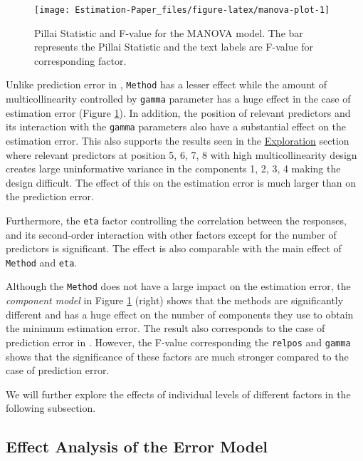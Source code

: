 \documentclass[12pt,3p,authoryear]{elsarticle}
\providecommand{\tightlist}{%
  \setlength{\itemsep}{0pt}\setlength{\parskip}{0pt}}
\begin{document}
\begin{figure}
\texttt{[image: Estimation-Paper\_files/figure-latex/manova-plot-1]} \caption{Pillai Statistic and F-value for the MANOVA model. The
bar represents the Pillai Statistic and the text labels are F-value for
corresponding factor.}\label{fig:manova-plot}
\end{figure}

\begin{description}
\tightlist
\item[\textbf{Error Model:}]
Unlike prediction error in \citet{rimal2019pred}, \texttt{Method} has a
lesser effect while the amount of multicollinearity controlled by
\texttt{gamma} parameter has a huge effect in the case of estimation
error (Figure \ref{fig:manova-plot}). In addition, the position of
relevant predictors and its interaction with the \texttt{gamma}
parameters also have a substantial effect on the estimation error. This
also supports the results seen in the
\protect\hyperlink{exploration}{Exploration} section where relevant
predictors at position 5, 6, 7, 8 with high multicollinearity design
creates large uninformative variance in the components 1, 2, 3, 4 making
the design difficult. The effect of this on the estimation error is much
larger than on the prediction error.

Furthermore, the \texttt{eta} factor controlling the correlation between
the responses, and its second-order interaction with other factors
except for the number of predictors is significant. The effect is also
comparable with the main effect of \texttt{Method} and \texttt{eta}.
\item[\textbf{Component Model:}]
Although the \texttt{Method} does not have a large impact on the
estimation error, the \emph{component model} in Figure
\ref{fig:manova-plot} (right) shows that the methods are significantly
different and has a huge effect on the number of components they use to
obtain the minimum estimation error. The result also corresponds to the
case of prediction error in \citet{rimal2019pred}. However, the F-value
corresponding the \texttt{relpos} and \texttt{gamma} shows that the
significance of these factors are much stronger compared to the case of
prediction error.
\end{description}

We will further explore the effects of individual levels of different
factors in the following subsection.

\subsection{Effect Analysis of the Error
Model}\label{effect-analysis-of-the-error-model}
\end{document}
